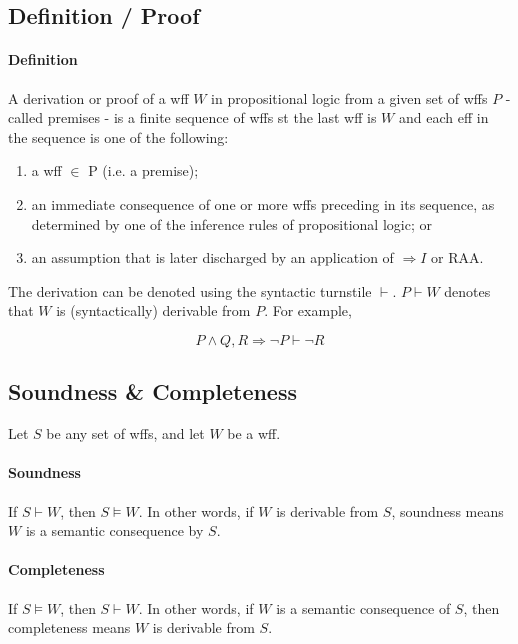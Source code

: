 \documentclass{article}
\begin{document}
\begin{multicols}{2}
  
  \subsection{Definition / Proof}
  
  \paragraph{Definition} A derivation or proof of a wff $W$ in propositional logic from a given set of wffs $P$ - called premises - is a finite sequence of wffs st the last wff is $W$ and each eff in the sequence is one of the following:
  
  \begin{enumerate}
  \item a wff $\in$ P (i.e. a premise); 
  \item an immediate consequence of one or more wffs preceding in its sequence, as determined by one of the inference rules of propositional logic; or
  \item an assumption that is later discharged by an application of $\Rightarrow I$ or RAA.
  \end{enumerate}
  
  The derivation can be denoted using the syntactic turnstile $\vdash$. $P \vdash W$ denotes that $W$ is (syntactically) derivable from $P$. For example, 
  
  $$P \land Q, R \Rightarrow \lnot P \vdash \lnot R$$
  
  \subsection{Soundness \& Completeness}
  
  Let $S$ be any set of wffs, and let $W$ be a wff.
  
  \paragraph{Soundness} If $S \vdash W$, then $S \vDash W$. In other words, if $W$ is derivable from $S$, soundness means $W$ is a semantic consequence by $S$.
  
  \paragraph{Completeness} If $S \vDash W$, then $S \vdash W$. In other words, if $W$ is a semantic consequence of $S$, then completeness means $W$ is derivable from $S$.
  

\end{multicols}
\end{document}
